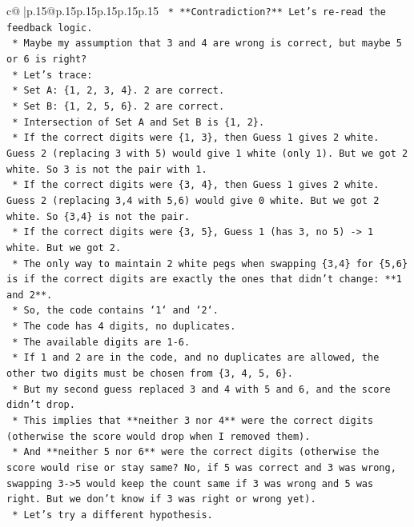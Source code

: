 \documentclass{article}
\begin{document}
{\begin{supertabular}{c@{$\;$}|p{.15\linewidth}@{}p{.15\linewidth}p{.15\linewidth}p{.15\linewidth}p{.15\linewidth}p{.15\linewidth}}
{{{\texttt{    *   **Contradiction?** Let's re{-}read the feedback logic.} \\
\texttt{    *   Maybe my assumption that 3 and 4 are wrong is correct, but maybe 5 or 6 is right?} \\
\texttt{    *   Let's trace:} \\
\texttt{        *   Set A: \{1, 2, 3, 4\}. 2 are correct.} \\
\texttt{        *   Set B: \{1, 2, 5, 6\}. 2 are correct.} \\
\texttt{        *   Intersection of Set A and Set B is \{1, 2\}.} \\
\texttt{        *   If the correct digits were \{1, 3\}, then Guess 1 gives 2 white. Guess 2 (replacing 3 with 5) would give 1 white (only 1). But we got 2 white. So 3 is not the pair with 1.} \\
\texttt{        *   If the correct digits were \{3, 4\}, then Guess 1 gives 2 white. Guess 2 (replacing 3,4 with 5,6) would give 0 white. But we got 2 white. So \{3,4\} is not the pair.} \\
\texttt{        *   If the correct digits were \{3, 5\}, Guess 1 (has 3, no 5) {-}> 1 white. But we got 2.} \\
\texttt{        *   The only way to maintain 2 white pegs when swapping \{3,4\} for \{5,6\} is if the correct digits are exactly the ones that didn't change: **1 and 2**.} \\
\texttt{    *   So, the code contains `1` and `2`.} \\
\texttt{    *   The code has 4 digits, no duplicates.} \\
\texttt{    *   The available digits are 1{-}6.} \\
\texttt{    *   If 1 and 2 are in the code, and no duplicates are allowed, the other two digits must be chosen from \{3, 4, 5, 6\}.} \\
\texttt{    *   But my second guess replaced 3 and 4 with 5 and 6, and the score didn't drop.} \\
\texttt{    *   This implies that **neither 3 nor 4** were the correct digits (otherwise the score would drop when I removed them).} \\
\texttt{    *   And **neither 5 nor 6** were the correct digits (otherwise the score would rise or stay same? No, if 5 was correct and 3 was wrong, swapping 3{-}>5 would keep the count same if 3 was wrong and 5 was right. But we don't know if 3 was right or wrong yet).} \\
\texttt{    *   Let's try a different hypothesis.} \\
}}}
\end{supertabular}}
\end{document}
